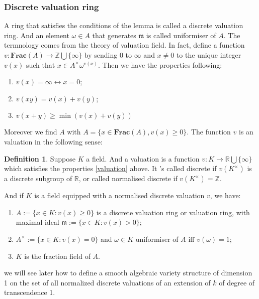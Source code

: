 \documentclass[12pt,a4paper,english]{article}
\theoremstyle{plain}
\theoremstyle{definition}
\newtheorem{defi}{Definition}
\theoremstyle{remark}
\newcommand{\Frac}{\mathbf{Frac}}
\begin{document}
\subsubsection{Discrete valuation ring}
A ring that satisfies the conditions of the lemma is called a discrete valuation ring. And an element $\omega\in A$ that generates $\mathfrak{m}$ is called uniformiser of $A$. The termnology comes from the theory of valuation field. In fact, define a function $v: \Frac(A)\rightarrow \mathbb{Z}\bigcup\{\infty\}$ by sending 0 to $\infty$ and $x\not=0$ to the unique integer $v(x)$ such that $x\in A^{\times}\omega^{v(x)}$. Then we have the properties following:
\begin{enumerate}\label{valuation}
    \item $v(x)=\infty\leftrightarrow x=0$;
    \item $v(xy)=v(x)+v(y)$;
    \item $v(x+y)\geq \min(v(x)+v(y))$
\end{enumerate}
Moreover we find $A$ with $A=\{x\in \Frac(A),v(x)\geq0\}$. The function $v$ is an valuation in the following sense:
\begin{defi}
Suppose $K$ a field. And a valuation is a function $v:K\rightarrow \mathbb{R}\bigcup\{\infty\}$ which satisfies the properties \ref{valuation} above. It 's called  discrete if $v(K^{\times})$ is a discrete subgroup of $\mathbb{R}$, or called normalised discrete if $v(K^{\times})=\mathbb{Z}$.

And if $K$ is a field equipped with a normalised discrete valuation $v$, we have:
\begin{enumerate}
    \item $A:=\{x\in K: v(x)\geq 0\}$ is a discrete valuation ring or valuation ring, with maximal ideal $\mathfrak{m}:=\{x\in K: v(x)>0\}$;
    \item $A^{\times}:=\{x\in K:v(x)=0\}$ and $\omega\in K$ uniformiser  of $A$ iff $v(\omega)=1$;
    \item $K$ is the fraction field of $A$.
\end{enumerate}
\end{defi}
we will see later how to define a smooth algebraic variety structure of dimension 1 on the set of all normalized discrete valuations of an extension of $k$ of degree of transcendence 1.
\end{document}
